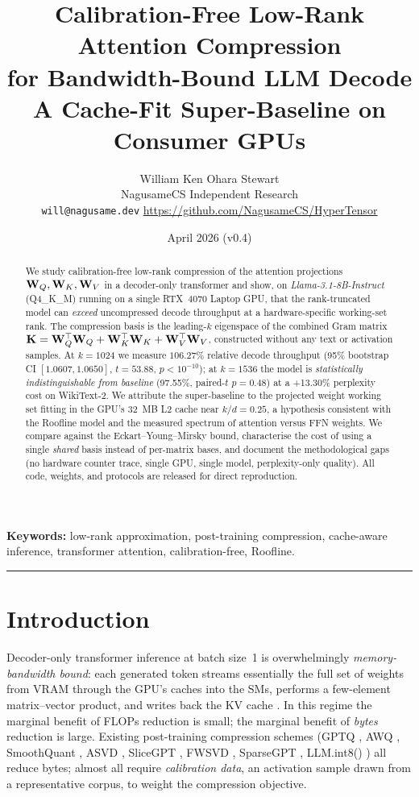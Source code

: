 \documentclass[11pt]{article}
\title{\textbf{Calibration-Free Low-Rank Attention Compression\\
for Bandwidth-Bound LLM Decode}\\[0.4em]
\large A Cache-Fit Super-Baseline on Consumer GPUs}
\author{William Ken Ohara Stewart\\
\small NagusameCS Independent Research\\
\small \texttt{will@nagusame.dev} \quad \url{https://github.com/NagusameCS/HyperTensor}}
\date{April 2026 (v0.4)}
\begin{document}
\maketitle
\hypertensorbanner

\begin{abstract}
\noindent
We study calibration-free low-rank compression of the attention projections
$\mathbf{W}_Q,\mathbf{W}_K,\mathbf{W}_V$ in a decoder-only transformer and show, on
\textit{Llama-3.1-8B-Instruct} (Q4\_K\_M) running on a single RTX~4070 Laptop
GPU, that the rank-truncated model can \emph{exceed} uncompressed decode
throughput at a hardware-specific working-set rank.  The compression basis is
the leading-$k$ eigenspace of the combined Gram matrix
$\mathbf{K}=\mathbf{W}_Q^\top\mathbf{W}_Q+\mathbf{W}_K^\top\mathbf{W}_K+\mathbf{W}_V^\top\mathbf{W}_V$,
constructed without any text or activation samples.  At
$k{=}1024$ we measure $106.27\%$ relative decode throughput
(95\% bootstrap CI $[1.0607,1.0650]$, $t{=}53.88$, $p<10^{-10}$);
at $k{=}1536$ the model is \emph{statistically indistinguishable from baseline}
(97.55\%, paired-$t$ $p{=}0.48$) at a +13.30\% perplexity cost on
WikiText-2.  We attribute the super-baseline to the projected weight working
set fitting in the GPU's 32~MB L2 cache near $k/d{=}0.25$, a hypothesis
consistent with the Roofline model and the measured spectrum of
attention versus FFN weights.  We compare against the Eckart--Young--Mirsky
bound, characterise the cost of using a single \emph{shared} basis instead of
per-matrix bases, and document the methodological gaps (no hardware counter
trace, single GPU, single model, perplexity-only quality).  All code, weights,
and protocols are released for direct reproduction.
\end{abstract}

\noindent\textbf{Keywords:} low-rank approximation, post-training compression,
cache-aware inference, transformer attention, calibration-free, Roofline.

\tableofcontents
\bigskip\hrule\bigskip

\section{Introduction}
\label{sec:intro}
Decoder-only transformer inference at batch size~1 is overwhelmingly
\emph{memory-bandwidth bound}: each generated token streams essentially the
full set of weights from VRAM through the GPU's caches into the SMs, performs
a few-element matrix--vector product, and writes back the KV cache
\cite{williams2009roofline,yuan2024llmroofline}.  In this regime the marginal
benefit of FLOPs reduction is small; the marginal benefit of \emph{bytes}
reduction is large.  Existing post-training compression schemes
(GPTQ \cite{frantar2022gptq}, AWQ \cite{lin2023awq}, SmoothQuant
\cite{xiao2022smoothquant}, ASVD \cite{yuan2023asvd},
SliceGPT \cite{ashkboos2024slicegpt}, FWSVD \cite{hsu2022fwsvd},
SparseGPT \cite{frantar2023sparsegpt}, LLM.int8() \cite{dettmers2022llmint8})
all reduce bytes; almost all require \emph{calibration data}, an activation
sample drawn from a representative corpus, to weight the compression
objective.
\end{document}
